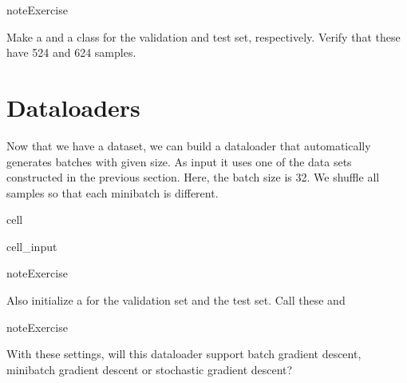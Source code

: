\documentclass[letterpaper,10pt,english]{jupyterBook}
\begin{document}
\begin{sphinxadmonition}{note}{Exercise}

\sphinxAtStartPar
Make a  and a  class for the validation and test set, respectively. Verify that these have 524 and 624 samples.
\end{sphinxadmonition}


\section{Dataloaders}
\label{\detokenize{notebooks/Tutorial2_ConvolutionalNeuralNetworks/Tutorial2_ConvolutionalNeuralNetworks_student:dataloaders}}
\sphinxAtStartPar
Now that we have a dataset, we can build a dataloader that automatically generates batches with given size. As input it uses one of the data sets constructed in the previous section. Here, the batch size is 32. We shuffle all samples so that each minibatch is different.

\begin{sphinxuseclass}{cell}\begin{sphinxVerbatimInput}

\begin{sphinxuseclass}{cell_input}
\begin{sphinxVerbatim}[commandchars=\\\{\}]
    
\end{sphinxVerbatim}

\end{sphinxuseclass}\end{sphinxVerbatimInput}

\end{sphinxuseclass}
\begin{sphinxadmonition}{note}{Exercise}

\sphinxAtStartPar
Also initialize a  for the validation set and the test set. Call these  and 
\end{sphinxadmonition}

\begin{sphinxadmonition}{note}{Exercise}

\sphinxAtStartPar
With these settings, will this dataloader support batch gradient descent, mini\sphinxhyphen{}batch gradient descent or stochastic gradient descent?
\end{sphinxadmonition}
\end{document}
